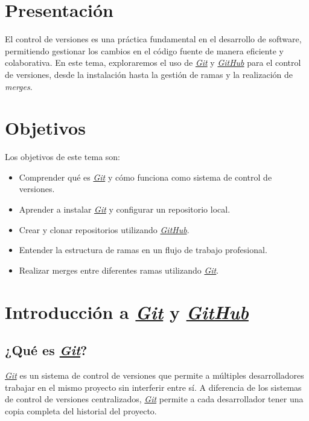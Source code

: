 \documentclass{template/uem_theme}
\begin{document}

\uemListContents

\section*{Presentación}
\label{sec:presentacion}

El control de versiones es una práctica fundamental en el desarrollo de software, permitiendo gestionar los cambios en el código fuente de manera eficiente y colaborativa. En este tema, exploraremos el uso de \href{https://git-scm.com/}{\textit{Git}} y \textit{\href{https://github.com}{\textit{GitHub}}} para el control de versiones, desde la instalación hasta la gestión de ramas y la realización de \textit{merges}.

\section*{Objetivos}
\label{sec:objetivos}

Los objetivos de este tema son:
\begin{itemize}
    \item Comprender qué es \href{https://git-scm.com/}{\textit{Git}} y cómo funciona como sistema de control de versiones.
    \item Aprender a instalar \href{https://git-scm.com/}{\textit{Git}} y configurar un repositorio local.
    \item Crear y clonar repositorios utilizando \href{https://github.com}{\textit{GitHub}}.
    \item Entender la estructura de ramas en un flujo de trabajo profesional.
    \item Realizar merges entre diferentes ramas utilizando \href{https://git-scm.com/}{\textit{Git}}.
\end{itemize}


\newpage
\section{Introducción a \href{https://git-scm.com/}{\textit{Git}} y \href{https://github.com}{\textit{GitHub}}}
\subsection{¿Qué es \href{https://git-scm.com/}{\textit{Git}}?}
\href{https://git-scm.com/}{\textit{Git}} es un sistema de control de versiones que permite a múltiples desarrolladores trabajar en el mismo proyecto sin interferir entre sí. A diferencia de los sistemas de control de versiones centralizados, \href{https://git-scm.com/}{\textit{Git}} permite a cada desarrollador tener una copia completa del historial del proyecto.
\vspace{0.5cm}
\end{document}
